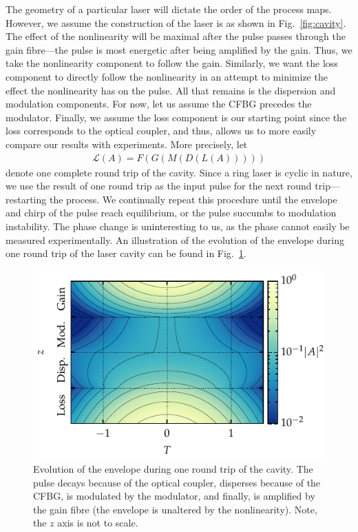 \documentclass[9pt,twocolumn,twoside]{osajnl}
\begin{document}
The geometry of a particular laser will dictate the order of the process maps. However, we assume the construction of the laser is as shown in Fig.~\ref{fig:cavity}. The effect of the nonlinearity will be maximal after the pulse passes through the gain fibre---the pulse is most energetic after being amplified by the gain. Thus, we take the nonlinearity component to follow the gain. Similarly, we want the loss component to directly follow the nonlinearity in an attempt to minimize the effect the nonlinearity has on the pulse. All that remains is the dispersion and modulation components. For now, let us assume the CFBG precedes the modulator. Finally, we assume the loss component is our starting point since the loss corresponds to the optical coupler, and thus, allows us to more easily compare our results with experiments. More precisely, let
\begin{align}
	\mathcal{L}(A) = F(G(M(D(L(A)))))
	\label{eq:order}
\end{align}
denote one complete round trip of the cavity. Since a ring laser is cyclic in nature, we use the result of one round trip as the input pulse for the next round trip---restarting the process. We continually repeat this procedure until the envelope and chirp of the pulse reach equilibrium, or the pulse succumbs to modulation instability. The phase change is uninteresting to us, as the phase cannot easily be measured experimentally. An illustration of the evolution of the envelope during one round trip of the laser cavity can be found in Fig.~\ref{fig:cavityevo}.

\begin{figure}[tbp]
	\centering
	\includegraphics{Figures/Evo}
	\caption{Evolution of the envelope during one round trip of the cavity. The pulse decays because of the optical coupler, disperses because of the CFBG, is modulated by the modulator, and finally, is amplified by the gain fibre (the envelope is unaltered by the nonlinearity). Note, the $z$ axis is not to scale.}
	\label{fig:cavityevo}
\end{figure}
\end{document}
